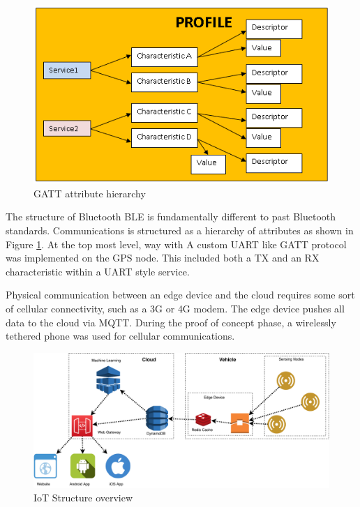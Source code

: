 \documentclass[DIV=current]{scrartcl}
\begin{document}
	
	\begin{figure}
		\centering
		\includegraphics[width=\linewidth]{images/ble-profile.png}
		\caption{GATT attribute hierarchy}
		\label{fig:gatt}
	\end{figure}
	
	The structure of Bluetooth BLE is fundamentally different to past Bluetooth standards. Communications is structured as a hierarchy of attributes as shown in Figure \ref{fig:gatt}. At the top most level, way with A custom UART like GATT protocol was implemented on the GPS node. This included both a TX and an RX characteristic within a UART style service.
	
	Physical communication between an edge device and the cloud requires some sort of cellular connectivity, such as a 3G or 4G modem. The edge device pushes all data to the cloud via MQTT. During the proof of concept phase, a wirelessly tethered phone was used for cellular communications.
	
	\begin{figure}[h]
		\centering
		\includegraphics[width=\linewidth]{images/IoT-Diagram.pdf}
		\caption{IoT Structure overview}
		\label{fig:commsgraph}
	\end{figure}
	
\end{document}
